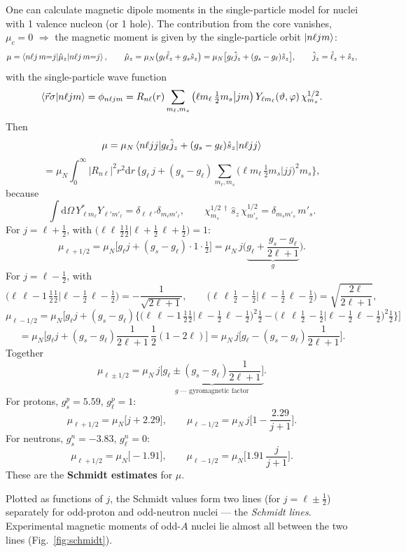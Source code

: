 \documentclass[11pt,a4paper]{article}
\newcommand{\op}[1]{\hat{#1}}
\newcommand{\ud}{\mathrm{d}}
\begin{document}
One can calculate magnetic dipole moments in the single-particle model for nuclei with 1 valence nucleon (or 1 hole). The contribution from the core vanishes, $\mu_c=0$ $\Rightarrow$ the magnetic moment is given by the single-particle orbit $\ket{n\ell jm}$:
\[
\mu=\braket{n\ell j\,m{=}j|\op\mu_z|n\ell j\,m{=}j},
\qquad
\op\mu_z=\mu_N\big(g_\ell\op\ell_z+g_s\op s_z\big)=\mu_N\big[g_\ell\op j_z+(g_s-g_\ell)\op s_z\big],
\qquad \op j_z=\op\ell_z+\op s_z ,
\]
with the single-particle wave function
\[
\braket{\vec r\sigma|n\ell jm}=\phi_{n\ell jm}=R_{n\ell}(r)\sum_{m_\ell,m_s}\big(\ell m_\ell\,\tfrac12 m_s\big|jm\big)\,Y_{\ell m_\ell}(\vartheta,\varphi)\,\chi^{1/2}_{m_s}.
\]
Then
\[
\mu=\mu_N\braket{n\ell jj|g_\ell\op j_z+(g_s-g_\ell)\op s_z|n\ell jj}
\]
\[
=\mu_N\int_0^\infty|R_{n\ell}|^2r^2\ud r\,\Big\{g_\ell\,j+(g_s-g_\ell)\sum_{m_\ell,m_s}\big(\ell m_\ell\,\tfrac12 m_s\big|jj\big)^2m_s\Big\},
\]
because
\[
\int\ud\Omega\,Y^*_{\ell m_\ell}Y_{\ell' m'_\ell}=\delta_{\ell\ell'}\delta_{m_\ell m'_\ell},
\qquad
\chi^{1/2\,\dagger}_{m_s}\,\op s_z\,\chi^{1/2}_{m'_s}=\delta_{m_sm'_s}\,m'_s .
\]
For $j=\ell+\frac12$, with $\big(\ell\ell\,\tfrac12\tfrac12\big|\ell{+}\tfrac12\,\ell{+}\tfrac12\big)=1$:
\[
\mu_{\ell+1/2}=\mu_N\Big[g_\ell j+(g_s-g_\ell)\cdot1\cdot\tfrac12\Big]
=\mu_N\,j\Big(\underbrace{g_\ell+\frac{g_s-g_\ell}{2\ell+1}}_{g}\Big).
\]
For $j=\ell-\frac12$, with
\[
\big(\ell\,\ell{-}1\,\tfrac12\tfrac12\big|\ell{-}\tfrac12\,\ell{-}\tfrac12\big)=-\frac{1}{\sqrt{2\ell+1}},
\qquad
\big(\ell\,\ell\,\tfrac12\,{-}\tfrac12\big|\ell{-}\tfrac12\,\ell{-}\tfrac12\big)=\sqrt{\frac{2\ell}{2\ell+1}},
\]
\[
\mu_{\ell-1/2}=\mu_N\Big[g_\ell j+(g_s-g_\ell)\Big\{\big(\ell\,\ell{-}1\,\tfrac12\tfrac12\big|\ell{-}\tfrac12\,\ell{-}\tfrac12\big)^2\tfrac12
-\big(\ell\,\ell\,\tfrac12\,{-}\tfrac12\big|\ell{-}\tfrac12\,\ell{-}\tfrac12\big)^2\tfrac12\Big\}\Big]
\]
\[
=\mu_N\Big[g_\ell j+(g_s-g_\ell)\frac{1}{2\ell+1}\,\frac12(1-2\ell)\Big]
=\mu_N\,j\Big[g_\ell-(g_s-g_\ell)\frac{1}{2\ell+1}\Big].
\]
Together
\[
\mu_{\ell\pm1/2}=\mu_N\,j\underbrace{\Big[g_\ell\pm(g_s-g_\ell)\frac{1}{2\ell+1}\Big]}_{g\ \text{--- gyromagnetic factor}} .
\]
For protons, $g_s^p=5.59$, $g_\ell^p=1$:
\[
\mu_{\ell+1/2}=\mu_N\big[j+2.29\big],\qquad
\mu_{\ell-1/2}=\mu_N\,j\Big[1-\frac{2.29}{j+1}\Big].
\]
For neutrons, $g_s^n=-3.83$, $g_\ell^n=0$:
\[
\mu_{\ell+1/2}=\mu_N\big[-1.91\big],\qquad
\mu_{\ell-1/2}=\mu_N\Big[1.91\,\frac{j}{j+1}\Big].
\]
These are the \textbf{Schmidt estimates} for $\mu$.

Plotted as functions of $j$, the Schmidt values form two lines (for $j=\ell\pm\frac12$) separately for odd-proton and odd-neutron nuclei --- the \emph{Schmidt lines}. Experimental magnetic moments of odd-$A$ nuclei lie almost all between the two lines (Fig.~\ref{fig:schmidt}).
\end{document}
